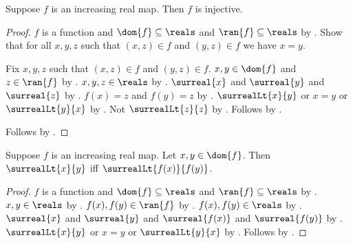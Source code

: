 \begin{theorem}\label{increasing_real_map_injective}
    Suppose $f$ is an increasing real map.
    Then $f$ is injective.
\end{theorem}
\begin{proof}
    $f$ is a function and $\dom{f}\subseteq\reals$ and $\ran{f}\subseteq\reals$ by
        .
    Show that for all $x,y,z$ such that $(x,z)\in f$ and $(y,z)\in f$ we have $x=y$.
    \begin{subproof}
        Fix $x,y,z$ such that $(x,z)\in f$ and $(y,z)\in f$.
        $x,y\in\dom{f}$ and $z\in\ran{f}$ by .
        $x,y,z\in\reals$ by .
        $\surreal{x}$ and $\surreal{y}$ and $\surreal{z}$ by
            .
        $f(x)=z$ and $f(y)=z$ by .
        $\surrealLt{x}{y}$ or $x=y$ or $\surrealLt{y}{x}$ by
            .
        Not $\surrealLt{z}{z}$ by .
        Follows by .
    \end{subproof}
    Follows by .
\end{proof}

\begin{theorem}\label{increasing_real_map_order_iff}
    Suppose $f$ is an increasing real map.
    Let $x,y\in\dom{f}$.
    Then $\surrealLt{x}{y}$ iff $\surrealLt{f(x)}{f(y)}$.
\end{theorem}
\begin{proof}
    $f$ is a function and $\dom{f}\subseteq\reals$ and $\ran{f}\subseteq\reals$ by
        .
    $x,y\in\reals$ by .
    $f(x),f(y)\in\ran{f}$ by .
    $f(x),f(y)\in\reals$ by .
    $\surreal{x}$ and $\surreal{y}$ and $\surreal{f(x)}$ and $\surreal{f(y)}$ by
        .
    $\surrealLt{x}{y}$ or $x=y$ or $\surrealLt{y}{x}$ by
        .
    Follows by .
\end{proof}

